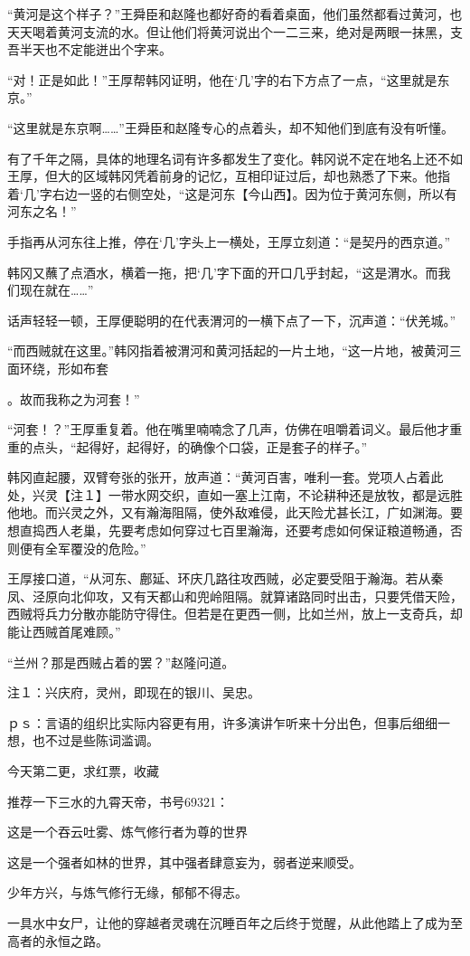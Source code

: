 “黄河是这个样子？”王舜臣和赵隆也都好奇的看着桌面，他们虽然都看过黄河，也天天喝着黄河支流的水。但让他们将黄河说出个一二三来，绝对是两眼一抹黑，支吾半天也不定能迸出个字来。

“对！正是如此！”王厚帮韩冈证明，他在‘几’字的右下方点了一点，“这里就是东京。”

“这里就是东京啊……”王舜臣和赵隆专心的点着头，却不知他们到底有没有听懂。

有了千年之隔，具体的地理名词有许多都发生了变化。韩冈说不定在地名上还不如王厚，但大的区域韩冈凭着前身的记忆，互相印证过后，却也熟悉了下来。他指着‘几’字右边一竖的右侧空处，“这是河东【今山西】。因为位于黄河东侧，所以有河东之名！”

手指再从河东往上推，停在‘几’字头上一横处，王厚立刻道：“是契丹的西京道。”

韩冈又蘸了点酒水，横着一拖，把‘几’字下面的开口几乎封起，“这是渭水。而我们现在就在……”

话声轻轻一顿，王厚便聪明的在代表渭河的一横下点了一下，沉声道：“伏羌城。”

“而西贼就在这里。”韩冈指着被渭河和黄河括起的一片土地，“这一片地，被黄河三面环绕，形如布套

。故而我称之为河套！”

“河套！？”王厚重复着。他在嘴里喃喃念了几声，仿佛在咀嚼着词义。最后他才重重的点头，“起得好，起得好，的确像个口袋，正是套子的样子。”

韩冈直起腰，双臂夸张的张开，放声道：“黄河百害，唯利一套。党项人占着此处，兴灵【注１】一带水网交织，直如一塞上江南，不论耕种还是放牧，都是远胜他地。而兴灵之外，又有瀚海阻隔，使外敌难侵，此天险尤甚长江，广如渊海。要想直捣西人老巢，先要考虑如何穿过七百里瀚海，还要考虑如何保证粮道畅通，否则便有全军覆没的危险。”

王厚接口道，“从河东、鄜延、环庆几路往攻西贼，必定要受阻于瀚海。若从秦凤、泾原向北仰攻，又有天都山和兜岭阻隔。就算诸路同时出击，只要凭借天险，西贼将兵力分散亦能防守得住。但若是在更西一侧，比如兰州，放上一支奇兵，却能让西贼首尾难顾。”

“兰州？那是西贼占着的罢？”赵隆问道。

注１：兴庆府，灵州，即现在的银川、吴忠。

ｐｓ：言语的组织比实际内容更有用，许多演讲乍听来十分出色，但事后细细一想，也不过是些陈词滥调。

今天第二更，求红票，收藏

推荐一下三水的九霄天帝，书号69321：

这是一个吞云吐雾、炼气修行者为尊的世界

这是一个强者如林的世界，其中强者肆意妄为，弱者逆来顺受。

少年方兴，与炼气修行无缘，郁郁不得志。

一具水中女尸，让他的穿越者灵魂在沉睡百年之后终于觉醒，从此他踏上了成为至高者的永恒之路。

